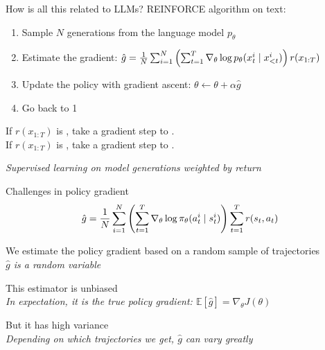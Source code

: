 \documentclass[usenames,dvipsnames,notes,11pt,aspectratio=169,hyperref={colorlinks=true, linkcolor=blue}]{beamer}
\begin{document}
\begin{frame}
    {How is all this related to LLMs?}{}
    REINFORCE algorithm on text:\\
    \begin{enumerate}
        \item Sample $N$ generations from the language model $p_\theta$
        \item Estimate the gradient: 
            $
            \hat{g} = \frac{1}{N}\sum_{i=1}^N
            \left( \sum_{t=1}^T \nabla_\theta\log p_\theta(x_t^i\mid x_{<t}^i) \right)
            r(x_{1:T}) 
            $
        \item Update the policy with gradient ascent: $\theta \leftarrow \theta + \alpha \hat{g}$
        \item Go back to 1
    \end{enumerate}
    \pause

    \begin{mdframed}[backgroundcolor=gray!20, linewidth=0pt, frametitle={What is the algorithm doing?}]
        If $r(x_{1:T})$ is , take a gradient step to .\\ %
        If $r(x_{1:T})$ is , take a gradient step to . %

        {\em Supervised learning on model generations weighted by return}
    \end{mdframed}
\end{frame}

\begin{frame}
    {Challenges in policy gradient}
            $$
            \hat{g} = \frac{1}{N}\sum_{i=1}^N
            \left( \sum_{t=1}^T \nabla_\theta\log \pi_\theta(a_t^i\mid s_t^i) \right)
            \sum_{t=1}^Tr(s_t, a_t) 
            $$
    \begin{wideitemize}[<+->]
        \item We estimate the policy gradient based on a random sample of trajectories\\
            {\it $\hat{g}$ is a random variable}
        \item This estimator is unbiased\\
            {\it In expectation, it is the true policy gradient: $\mathbb{E}[\hat{g}] = \nabla_\theta J(\theta)$}
        \item But it has high variance\\
            {\it Depending on which trajectories we get, $\hat{g}$ can vary greatly}
    \end{wideitemize}
\end{frame}
\end{document}
